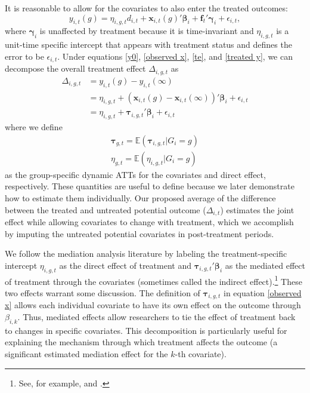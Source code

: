 \documentclass[12pt,fleqn]{article}
\def\*#1{\mathbf{#1}}
\def\+#1{\boldsymbol{#1}}
\begin{document}
It is reasonable to allow for the covariates to also enter the treated outcomes:
\begin{equation}
    y_{i,t}(g) = \eta_{i,g,t}d_{i,t} + \*x_{i,t}(g)' \+\beta_i + \*f_t' \+\gamma_i + \epsilon_{i,t},\label{treated y}
\end{equation}
where $\+\gamma_i$ is unaffected by treatment because it is time-invariant and $\eta_{i,g,t}$ is a unit-time specific intercept that appears with treatment status and defines the error to be $\epsilon_{i,t}$. Under equations \eqref{y0}, \eqref{observed x}, \eqref{te}, and \eqref{treated y}, we can decompose the overall treatment effect $\Delta_{i,g,t}$ as
\begin{align*}
    \Delta_{i,g,t} 
    &= y_{i,t}(g) - y_{i,t}(\infty)\\
    &= \eta_{i,g,t} + (\*x_{i,t}(g) - \*x_{i,t}(\infty))' \+\beta_i + \epsilon_{i,t}\\
    &= \eta_{i,g,t} + \+\tau_{i,g,t}' \+\beta_i + \epsilon_{i,t}
\end{align*}
where we define
\begin{align}
    \+\tau_{g,t} = \mathbb{E}(\+\tau_{i,g,t} | G_i = g)\label{covariate ATT}\\
    \eta_{g,t} = \mathbb{E}(\eta_{i,g,t} | G_i = g)\label{direct ATT}
\end{align}
as the group-specific dynamic ATTs for the covariates and direct effect, respectively. These quantities are useful to define because we later demonstrate how to estimate them individually. Our proposed average of the difference between the treated and untreated potential outcome ($\Delta_{i,t}$) estimates the joint effect while allowing covariates to change with treatment, which we accomplish by imputing the untreated potential covariates in post-treatment periods.

We follow the mediation analysis literature by labeling the treatment-specific intercept $\eta_{i,g,t}$ as the direct effect of treatment and $\+\tau_{i,g,t}'\+\beta_i$ as the mediated effect of treatment through the covariates (sometimes called the indirect effect).\footnote{See, for example, \citet{mackinnon2007mediation} and \citet{huber2014identifying}.} These two effects warrant some discussion. The definition of $\+\tau_{i,g,t}$ in equation \eqref{observed x} allows each individual covariate to have its own effect on the outcome through $\beta_{i,k}$. Thus, mediated effects allow researchers to tie the effect of treatment back to changes in specific covariates. This decomposition is particularly useful for explaining the mechanism through which treatment affects the outcome (a significant estimated mediation effect for the $k$-th covariate). 
\end{document}
